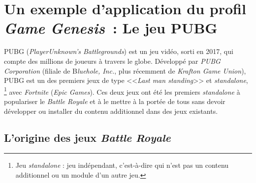 \chapter{Un exemple d'application du profil \emph{Game Genesis}~: Le jeu PUBG}
\label{chap.pubg}





PUBG (\emph{PlayerUnknown's Battlegrounds}) est un jeu vidéo, sorti en 2017, qui compte des millions de joueurs à travers le globe. Développé par \emph{PUBG Corporation} (filiale de B\emph{luehole, Inc.}, plus récemment de \emph{Krafton Game Union}), PUBG est un des premiers jeux de type <<\emph{Last man standing}>> et \emph{standalone},%
\footnote{Jeu \emph{standalone} : jeu indépendant, c'est-\`a-dire qui n'est pas un contenu additionnel ou un module d'un autre jeu.}
%
avec  \emph{Fortnite} (\emph{Epic Games}). Ces deux jeux ont été les premiers \emph{standalone} à populariser le \emph{Battle Royale} et à le mettre à la portée de tous sans devoir développer ou installer du contenu additionnel dans des jeux existants.



\section{L'origine des jeux \emph{Battle Royale}}

\label{sect.battle-royale}




